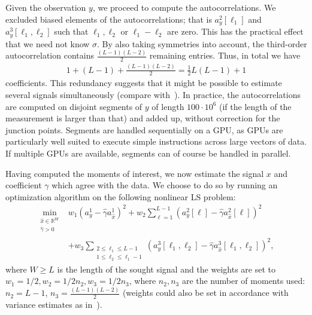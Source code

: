 \documentclass[9pt,twocolumn,twoside,lineno]{pnas-new}
\begin{document}
Given the observation $y$, we proceed to compute the autocorrelations. %
We excluded biased elements of the autocorrelations; that is $a_y^2[\ell_1]$ and $a_y^3[\ell_1, \ell_2]$ such that $\ell_1, \ell_2$ or $\ell_1 - \ell_2$ are zero. 
This has the  practical effect that we need not know $\sigma$. 
By also taking symmetries into account, the third-order autocorrelation contains $\frac{(L-1)(L-2)}{2}$ remaining entries. Thus, in total we have
\begin{align*}
1 + (L-1) + \frac{(L-1)(L-2)}{2} = \frac{1}{2} L (L-1) + 1
\end{align*}
coefficients. 
This redundancy suggests that it might be possible to estimate several signals simultaneously (compare with~\cite{boumal2017heterogeneous,bandeira2017estimation}).
In practice, the autocorrelations are computed on disjoint segments of $y$ of length $100\cdot10^6$ (if the length of the measurement is larger than that) and added up, without correction for the junction points. Segments are handled sequentially on a GPU, as GPUs are particularly well suited to execute simple instructions across large vectors of data. If multiple GPUs are available, segments can of course be handled in parallel.

Having computed the moments of interest, we now estimate the signal $x$ and coefficient $\gamma$ which agree with the data. We choose to do so by running an optimization algorithm on the following nonlinear LS problem:
\begin{align}
\min_{\substack{\hat x\in \mathbb{R}^{W} \\ \hat \gamma > 0}}& w_1 \left( a_y^1 - \hat \gamma a_{\hat x}^1 \right)^2  + w_2 \sum_{\ell = 1}^{L-1} \left( a_y^2[\ell] - \hat \gamma a_{\hat x}^2[\ell] \right)^2  \nonumber \\&+ w_3 \sum_{\substack{2\leq\ell_1\leq L-1 \\ 1 \leq \ell_2 \leq \ell_1-1}} \left( a_y^3[\ell_1, \ell_2] -  \hat \gamma a_{\hat x}^3[\ell_1,\ell_2] \right)^2, 
\label{eq:optim1D}
\end{align}
where $W \geq L$ is the length of the sought signal and the weights are set to $w_1 = 1/2, w_2 = 1/2n_2, w_3 = 1/2n_3$, where $n_2, n_3$ are the number of moments used: $n_2 = L-1$, $n_3 = \frac{(L-1)(L-2)}{2}$ (weights could also be set in accordance with variance estimates as in~\cite{boumal2017heterogeneous}).
\end{document}

